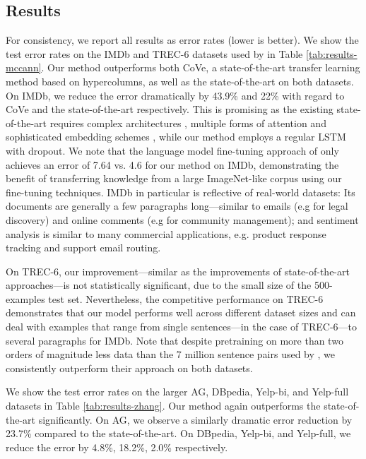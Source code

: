 \documentclass[11pt,a4paper]{article}
\begin{document}
\subsection{Results}

For consistency, we report all results as error rates (lower is better). We show the test error rates on the IMDb and TREC-6 datasets used by  in Table \ref{tab:results-mccann}. Our method outperforms both CoVe, a state-of-the-art transfer learning method based on hypercolumns, as well as the state-of-the-art on both datasets. On IMDb, we reduce the error dramatically by 43.9\% and 22\% with regard to CoVe and the state-of-the-art respectively. This is promising as the existing state-of-the-art requires complex architectures \cite{deepcontext2017}, multiple forms of attention \cite{Mccann2017} and sophisticated embedding schemes \cite{johnson2016supervised}, while our method employs a regular LSTM with dropout. We note that the language model fine-tuning approach of  only achieves an error of 7.64 vs. 4.6 for our method  on IMDb, demonstrating the benefit of transferring knowledge from a large ImageNet-like corpus using our fine-tuning techniques. IMDb in particular is reflective of real-world datasets: Its documents are generally a few paragraphs long---similar to emails (e.g for legal discovery) and online comments (e.g for community management); and sentiment analysis is similar to many commercial applications, e.g. product response tracking and support email routing.

On TREC-6, our improvement---similar as the improvements of state-of-the-art approaches---is not statistically significant, due to the small size of the 500-examples test set.
Nevertheless, the competitive performance on TREC-6 demonstrates that our model performs well across different dataset sizes and can deal with examples that range from single sentences---in the case of TREC-6---to several paragraphs for IMDb. Note that despite pretraining on more than two orders of magnitude less data than the 7 million sentence pairs used by , we consistently outperform their approach on both datasets.

We show the test error rates on the larger AG, DBpedia, Yelp-bi, and Yelp-full datasets in Table \ref{tab:results-zhang}. Our method again outperforms the state-of-the-art significantly. On AG, we observe a similarly dramatic error reduction by 23.7\% compared to the state-of-the-art. On DBpedia, Yelp-bi, and Yelp-full, we reduce the error by 4.8\%, 18.2\%, 2.0\% respectively.
\end{document}
